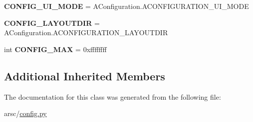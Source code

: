 \begin{DoxyCompactItemize}
\mbox{\label{classconfig_1_1ResTable__config_1_1Config_a2b127d386b288b59abb9162d78d87b4f}} 
{\bfseries C\+O\+N\+F\+I\+G\+\_\+\+U\+I\+\_\+\+M\+O\+DE} = A\+Configuration.\+A\+C\+O\+N\+F\+I\+G\+U\+R\+A\+T\+I\+O\+N\+\_\+\+U\+I\+\_\+\+M\+O\+DE
\item 
\mbox{\label{classconfig_1_1ResTable__config_1_1Config_a425ee34c8aa67deac6d44ee163c0b474}} 
{\bfseries C\+O\+N\+F\+I\+G\+\_\+\+L\+A\+Y\+O\+U\+T\+D\+IR} = A\+Configuration.\+A\+C\+O\+N\+F\+I\+G\+U\+R\+A\+T\+I\+O\+N\+\_\+\+L\+A\+Y\+O\+U\+T\+D\+IR
\item 
\mbox{\label{classconfig_1_1ResTable__config_1_1Config_a459fe5d949a6440d09b46e40ce5c5d7b}} 
int {\bfseries C\+O\+N\+F\+I\+G\+\_\+\+M\+AX} = 0xffffffff
\end{DoxyCompactItemize}
\subsection*{Additional Inherited Members}


The documentation for this class was generated from the following file\+:\begin{DoxyCompactItemize}
\item 
arsc/\mbox{\hyperlink{config_8py}{config.\+py}}\end{DoxyCompactItemize}
